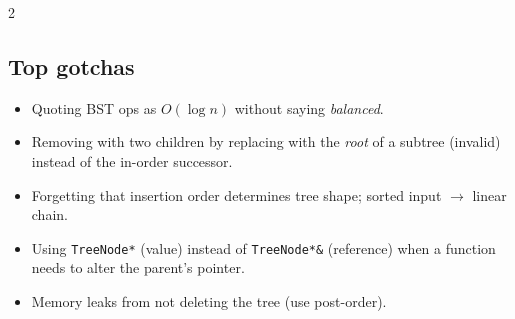 \documentclass[10pt]{article}
\begin{document}
\begin{multicols}{2}
\subsection*{Top gotchas}
\begin{itemize}
    \item Quoting BST ops as $O(\log n)$ without saying \emph{balanced}.
    \item Removing with two children by replacing with the \emph{root}
    of a subtree (invalid) instead of the in-order successor.
    \item Forgetting that insertion order determines tree shape;
    sorted input $\to$ linear chain.
    \item Using \texttt{TreeNode*} (value) instead of
    \texttt{TreeNode*\&} (reference) when a function needs to alter
    the parent's pointer.
    \item Memory leaks from not deleting the tree (use post-order).
\end{itemize}

\end{multicols}
\end{document}
